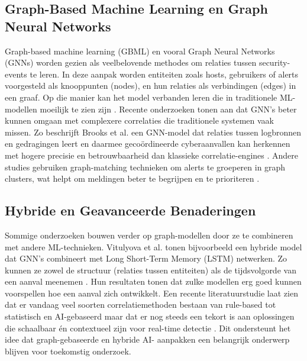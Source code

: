 \subsection{Graph-Based Machine Learning en Graph Neural Networks}
Graph-based machine learning (GBML)
\newline
en vooral Graph Neural Networks (GNNs) worden gezien als veelbelovende methodes om relaties tussen security-events te leren. In deze aanpak worden entiteiten zoals hosts, gebruikers of alerts voorgesteld als knooppunten (nodes), en hun relaties als verbindingen (edges) in een graaf. Op die manier kan het model verbanden leren die in traditionele ML-modellen moeilijk te zien zijn \autocite{Kanka2022}.  
\newline
Recente onderzoeken tonen aan dat GNN’s beter kunnen omgaan met complexere correlaties die traditionele systemen vaak missen. Zo beschrijft Brooks et al. een GNN-model dat relaties tussen logbronnen en gedragingen leert en daarmee gecoördineerde cyberaanvallen kan herkennen met hogere precisie en betrouwbaarheid dan klassieke correlatie-engines \autocite{Brooks2025}. \newline  
Andere studies gebruiken graph-matching technieken om alerts te groeperen in graph clusters, wat helpt om meldingen beter te begrijpen en te prioriteren \autocite{Vitulyova2025}.
\subsection{Hybride en Geavanceerde \newline Benaderingen}
Sommige onderzoeken bouwen verder op \newline graph-modellen door ze te combineren met andere ML-technieken. Vitulyova et al. tonen bijvoorbeeld een hybride model dat GNN’s combineert met Long Short-Term Memory (LSTM) netwerken. Zo kunnen ze zowel de structuur (relaties tussen entiteiten) als de tijdsvolgorde van een aanval meenemen \autocite{Vitulyova2025}. Hun resultaten tonen dat zulke modellen erg goed kunnen voorspellen hoe een aanval zich ontwikkelt.  
\newline
\newline
Een recente literatuurstudie laat zien dat er vandaag veel soorten correlatiemethoden bestaan van rule-based tot statistisch en AI-gebaseerd maar dat er nog steeds een tekort is aan oplossingen die schaalbaar én contextueel zijn voor real-time detectie \autocite{Kanka2022}. Dit ondersteunt het idee dat graph-gebaseerde en hybride AI- \newline aanpakken een belangrijk onderwerp blijven voor toekomstig onderzoek.
